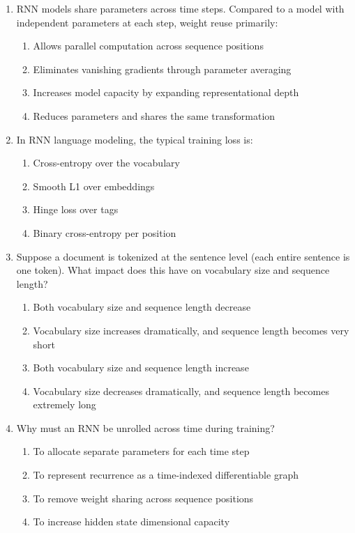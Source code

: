 \documentclass[12pt]{article}
\begin{document}
\begin{enumerate}[label=Q\arabic*.]
 \item RNN models share parameters across time steps. Compared to a model with independent parameters at each step, weight reuse primarily:
 \begin{enumerate}[label=(\Alph*)]
     \item Allows parallel computation across sequence positions
     \item Eliminates vanishing gradients through parameter averaging
     \item Increases model capacity by expanding representational depth
     \item Reduces parameters and shares the same transformation
 \end{enumerate}
 
 \item In RNN language modeling, the typical training loss is:
 \begin{enumerate}[label=(\Alph*)]
     \item Cross-entropy over the vocabulary
     \item Smooth L1 over embeddings
     \item Hinge loss over tags
     \item Binary cross-entropy per position
 \end{enumerate}
 
 \item Suppose a document is tokenized at the sentence level (each entire sentence is one token). What impact does this have on vocabulary size and sequence length?
 \begin{enumerate}[label=(\Alph*)]
     \item Both vocabulary size and sequence length decrease
     \item Vocabulary size increases dramatically, and sequence length becomes very short
     \item Both vocabulary size and sequence length increase
     \item Vocabulary size decreases dramatically, and sequence length becomes extremely long
 \end{enumerate}
 
 \item Why must an RNN be unrolled across time during training?
 \begin{enumerate}[label=(\Alph*)]
     \item To allocate separate parameters for each time step
     \item To represent recurrence as a time-indexed differentiable graph
     \item To remove weight sharing across sequence positions
     \item To increase hidden state dimensional capacity
 \end{enumerate}
 

\end{enumerate}
\end{document}
